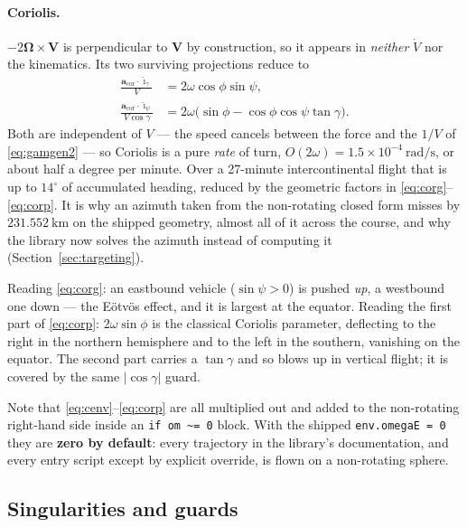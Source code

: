 \documentclass[11pt]{article}
\newcommand{\ig}{\hat{\boldsymbol{\imath}}_{\gamma}}
\newcommand{\ip}{\hat{\boldsymbol{\imath}}_{\psi}}
\newcommand{\bOmega}{\boldsymbol{\Omega}}
\newcommand{\code}[1]{\texttt{#1}}
\begin{document}
\paragraph{Coriolis.}
$-2\bOmega\times\mathbf{V}$ is perpendicular to $\mathbf{V}$ by construction,
so it appears in \emph{neither} $\dot V$ nor the kinematics. Its two surviving
projections reduce to
\begin{align}
  \frac{\mathbf{a}_{\text{cor}}\cdot\ig}{V}
    &= 2\omega\cos\phi\sin\psi ,                                  \label{eq:corg}\\
  \frac{\mathbf{a}_{\text{cor}}\cdot\ip}{V\cos\gamma}
    &= 2\omega\bigl(\sin\phi - \cos\phi\cos\psi\tan\gamma\bigr) .  \label{eq:corp}
\end{align}
Both are independent of $V$ --- the speed cancels between the force and the
$1/V$ of \eqref{eq:gamgen2} --- so Coriolis is a pure \emph{rate} of turn,
$O(2\omega) = 1.5\times10^{-4}~\mathrm{rad/s}$, or about half a degree per
minute. Over a 27-minute intercontinental flight that is up to $14^{\circ}$ of
accumulated heading, reduced by the geometric factors in
\eqref{eq:corg}--\eqref{eq:corp}. It is why an azimuth taken from the
non-rotating closed form misses by $231.552~\mathrm{km}$ on the shipped
geometry, almost all of it across the course, and why the library now solves
the azimuth instead of computing it (Section~\ref{sec:targeting}).

Reading \eqref{eq:corg}: an eastbound vehicle ($\sin\psi>0$) is pushed
\emph{up}, a westbound one down --- the E\"otv\"os effect, and it is largest at
the equator. Reading the first part of \eqref{eq:corp}: $2\omega\sin\phi$ is
the classical Coriolis parameter, deflecting to the right in the northern
hemisphere and to the left in the southern, vanishing on the equator. The
second part carries a $\tan\gamma$ and so blows up in vertical flight; it is
covered by the same $|\cos\gamma|$ guard.

Note that \eqref{eq:cenv}--\eqref{eq:corp} are all multiplied out and added to
the non-rotating right-hand side inside an \code{if om \textasciitilde= 0}
block. With the shipped \code{env.omegaE = 0} they are \textbf{zero by
default}: every trajectory in the library's documentation, and every entry
script except by explicit override, is flown on a non-rotating sphere.

\subsection{Singularities and guards}
\end{document}
